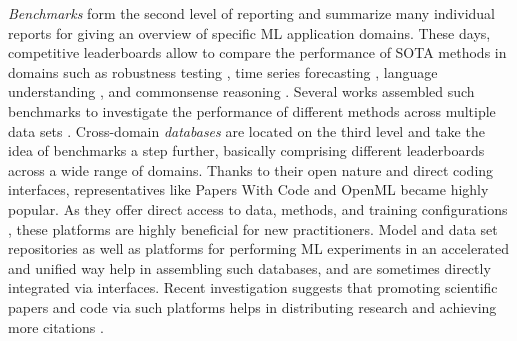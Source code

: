 \documentclass[sn-mathphys,Numbered]{sn-jnl}%
\theoremstyle{thmstylethree}%
\begin{document}
\emph{Benchmarks} form the second level of reporting and summarize many individual reports for giving an overview of specific ML application domains.
These days, competitive leaderboards allow to compare the performance of SOTA methods in domains such as robustness testing \cite{croce2020robustbench}, time series forecasting \cite{godahewa2021monash}, language understanding \cite{srivastava_beyond_2022,wang_superglue_2019}, and commonsense reasoning \cite{sakaguchi_winogrande_2021}.
Several works assembled such benchmarks to investigate the performance of different methods across multiple data sets \cite{demsar_statistical_2006,ismail-fawaz_approach_2023}.
Cross-domain \emph{databases} are located on the third level and take the idea of benchmarks a step further, basically comprising different leaderboards across a wide range of domains.
Thanks to their open nature and direct coding interfaces, representatives like Papers With Code \cite{paperswithcode} and OpenML \cite{vanschoren2014openml} became highly popular.
As they offer direct access to data, methods, and training configurations  \cite{feurer_openml-python_2021}, these platforms are highly beneficial for new practitioners.
Model and data set repositories \cite{jain_hugging_2022} as well as platforms for performing ML experiments in an accelerated and unified way \cite{zaharia_accelerating_2018,demsar_orange_2013,Mierswa/etal/2006a} help in assembling such databases, and are sometimes directly integrated via interfaces.
Recent investigation suggests that promoting scientific papers and code via such platforms \cite{paperswithcode} helps in distributing research and achieving more citations \cite{kang_papers_2023}.
\end{document}
